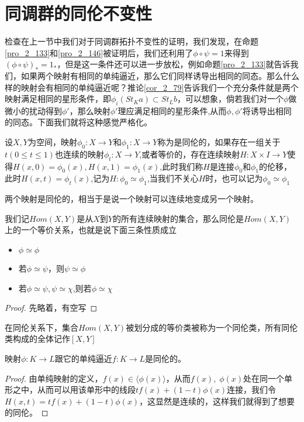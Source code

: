 \section{同调群的同伦不变性}
检查在上一节中我们对于同调群拓扑不变性的证明，我们发现，在命题\eqref{pro_2_133}和\eqref{pro_2_146}被证明后，我们还利用了$\phi\circ \psi=1$来得到$(\phi\circ \psi)_{*}=1_{*}$，但是这一条件还可以进一步放松，例如命题\eqref{pro_2_133}就告诉我们，如果两个映射有相同的单纯逼近，那么它们同样诱导出相同的同态。那么什么样的映射会有相同的单纯逼近呢？推论\eqref{cor_2_79}告诉我们一个充分条件就是两个映射满足相同的星形条件，即$\phi_{i}(St_{K}a)\subset St_{L}b$，可以想象，倘若我们对一个$\phi$做微小的扰动得到$\phi'$，那么映射$\phi'$理应满足相同的星形条件,从而$\phi,\phi'$将诱导出相同的同态。下面我们就将这种感觉严格化。
\begin{definition}
设$X,Y$为空间，映射$\phi_{0}:X\rightarrow Y$和$\phi_{1}:X\rightarrow Y$称为是同伦的，如果存在一组关于$t(0\leq t\leq 1)$也连续的映射$\phi_{t}:X\rightarrow Y$,或者等价的，存在连续映射$H:X\times I\rightarrow Y$使得$H(x,0)=\phi_{0}(x),H(x,1)=\phi_{1}(x)$,此时我们称$H$是连接$\phi_{0}$和$\phi_{1}$的伦移，此时$H(x,t)=\phi_{t}(x)$,记为$H:\phi_{0}\simeq \phi_{1}$,当我们不关心$H$时，也可以记为$\phi_{0}\simeq \phi_{1}$
\end{definition}
\begin{remark}
两个映射是同伦的，相当于是说一个映射可以连续地变成另一个映射。
\end{remark}
\begin{proposition}
我们记$Hom(X,Y)$是从$X$到$Y$的所有连续映射的集合，那么同伦是$Hom(X,Y)$上的一个等价关系，也就是说下面三条性质成立
\begin{itemize}
    \item $\phi\simeq \phi$
    \item 若$\phi\simeq \psi$，则$\psi\simeq \phi$
    \item 若$\phi\simeq \psi,\psi\simeq \chi$,则若$\phi\simeq \chi$
\end{itemize}
\end{proposition}
\begin{proof}
先略着，有空写
\end{proof}
\begin{definition}
在同伦关系下，集合$Hom(X,Y)$被划分成的等价类被称为一个同伦类，所有同伦类构成的全体记作$[X,Y]$
\end{definition}
\begin{proposition}
    映射$\phi:K\rightarrow L$跟它的单纯逼近$f:K\rightarrow L$是同伦的。
\end{proposition}
\begin{proof}
由单纯映射的定义，$f(x)\in\langle\phi(x)\rangle$，从而$f(x),\;\phi(x)$处在同一个单形之中，从而可以用该单形中的线段$tf(x)+(1-t)\phi(x)$连接，我们令$H(x,t)=tf(x)+(1-t)\phi(x)$，这显然是连续的，这样我们就得到了想要的同伦。
\end{proof}


